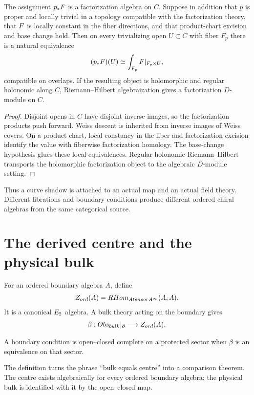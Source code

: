 \begin{theorem}
The assignment $p_*F$ is a factorization algebra on $C$. Suppose in addition that $p$ is proper and locally trivial in a topology compatible with the factorization theory, that $F$ is locally constant in the fiber directions, and that product-chart excision and base change hold. Then on every trivializing open $U\subset C$ with fiber $F_p$ there is a natural equivalence
\[
 (p_*F)(U)\simeq
 \int_{F_p}F|_{F_p\times U},
\]
compatible on overlaps. If the resulting object is holomorphic and regular holonomic along $C$, Riemann--Hilbert algebraization gives a factorization $D$-module on $C$.
\end{theorem}
\begin{proof}
Disjoint opens in $C$ have disjoint inverse images, so the factorization products push forward. Weiss descent is inherited from inverse images of Weiss covers. On a product chart, local constancy in the fiber and factorization excision identify the value with fiberwise factorization homology. The base-change hypothesis glues these local equivalences. Regular-holonomic Riemann--Hilbert transports the holomorphic factorization object to the algebraic $D$-module setting.
\end{proof}

Thus a curve shadow is attached to an actual map and an actual field theory. Different fibrations and boundary conditions produce different ordered chiral algebras from the same categorical source.

\chapter{The derived centre and the physical bulk}
For an ordered boundary algebra $A$, define
\[
 Z_{ord}(A)=RHom_{Atensor A^{op}}(A,A).
\]
It is a canonical $E_2$ algebra. A bulk theory acting on the boundary gives
\[
 \beta:Obs_{bulk}|_{\partial}\longrightarrow Z_{ord}(A).
\]

\begin{definition}
A boundary condition is open--closed complete on a protected sector when $\beta$ is an equivalence on that sector.
\end{definition}

The definition turns the phrase ``bulk equals centre'' into a comparison theorem. The centre exists algebraically for every ordered boundary algebra; the physical bulk is identified with it by the open--closed map.

